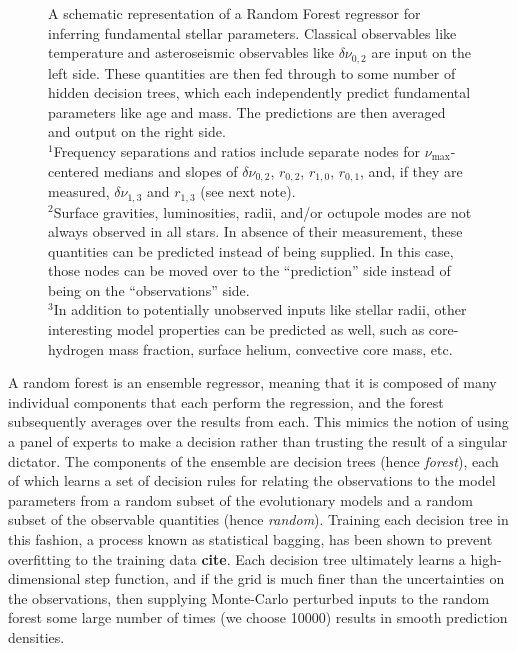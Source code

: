 \documentclass[manuscript]{aastex}
\begin{document}
\begin{figure}
    \centering
    
    \caption{A schematic representation of a Random Forest regressor for inferring fundamental stellar parameters. Classical observables like temperature and asteroseismic observables like $\delta\nu_{0,2}$ are input on the left side. These quantities are then fed through to some number of hidden decision trees, which each independently predict fundamental parameters like age and mass. The predictions are then averaged and output on the right side. \\
    $^1$Frequency separations and ratios include separate nodes for $\nu_{\max}$-centered medians and slopes of $\delta\nu_{0,2}$, $r_{0,2}$, $r_{1,0}$, $r_{0,1}$, and, if they are measured, $\delta\nu_{1,3}$ and $r_{1,3}$ (see next note). \\
    $^2$Surface gravities, luminosities, radii, and/or octupole modes are not always observed in all stars. In absence of their measurement, these quantities can be predicted instead of being supplied. In this case, those nodes can be moved over to the ``prediction'' side instead of being on the ``observations'' side. \\
    $^3$In addition to potentially unobserved inputs like stellar radii, other interesting model properties can be predicted as well, such as core-hydrogen mass fraction, surface helium, convective core mass, etc. }
    \label{fig:rf}
\end{figure}

A random forest is an ensemble regressor, meaning that it is composed of many individual components that each perform the regression, and the forest subsequently averages over the results from each. This mimics the notion of using a panel of experts to make a decision rather than trusting the result of a singular dictator. The components of the ensemble are decision trees (hence \emph{forest}), each of which learns a set of decision rules for relating the observations to the model parameters from a random subset of the evolutionary models and a random subset of the observable quantities (hence \emph{random}). Training each decision tree in this fashion, a process known as statistical bagging, has been shown to prevent overfitting to the training data \textbf{cite}. Each decision tree ultimately learns a high-dimensional step function, and if the grid is much finer than the uncertainties on the observations, then supplying Monte-Carlo perturbed inputs to the random forest some large number of times (we choose 10000) results in smooth prediction densities. 
\end{document}
